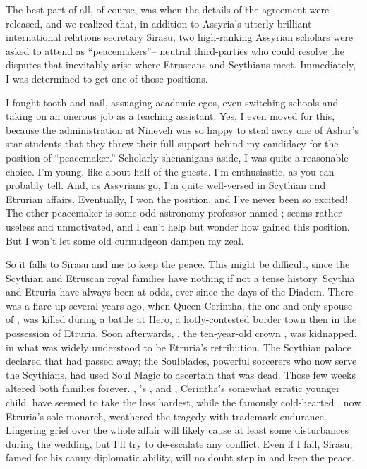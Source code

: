 \documentclass[char]{Kos}
\begin{document}
The best part of all, of course, was when the details of the agreement were released, and we realized that, in addition to Assyria's utterly brilliant international relations secretary Sirasu, two high-ranking Assyrian scholars were asked to attend as ``peacemakers''-- neutral third-parties who could resolve the disputes that inevitably arise where Etruscans and Scythians meet. Immediately, I was determined to get one of those positions.

I fought tooth and nail, assuaging academic egos, even switching schools and taking on an onerous job as a teaching assistant. Yes, I even moved for this, because the administration at Nineveh was so happy to steal away one of Ashur's star students that they threw their full support behind my candidacy for the position of ``peacemaker.'' Scholarly shenanigans aside, I was quite a reasonable choice. I'm young, like about half of the guests. I'm enthusiastic, as you can probably tell. And, as Assyrians go, I'm quite well-versed in Scythian and Etrurian affairs. Eventually, I won the position, and I've never been so excited! The other peacemaker is some odd astronomy professor named \cAnarchist{}; \cAnarchist{\they} seems rather useless and unmotivated, and I can't help but wonder how \cAnarchist{\they} gained this position. But I won't let some old curmudgeon dampen my zeal.

So it falls to Sirasu and me to keep the peace. This might be difficult, since the Scythian and Etruscan royal families have nothing if not a tense history. Scythia and Etruria have always been at odds, ever since the days of the Diadem. There was a flare-up several years ago, when Queen Cerintha, the one and only spouse of \cEtruriaKing{}, was killed during a battle at Hero, a hotly-contested border town then in the possession of Etruria. Soon afterwards, \cFugitive{}, the ten-year-old crown \cFugitive{\prince}, was kidnapped, in what was widely understood to be Etruria's retribution. The Scythian palace declared that \cFugitive{\nickname} had passed away; the Soulblades, powerful sorcerers who now serve the Scythians, had used Soul Magic to ascertain that \cFugitive{\they} was dead. Those few weeks altered both families forever. \cScythiaQueen{\nickname}, \cFugitive{}'s \cScythiaQueen{\parent}, and \cPoet{\nickname}, Cerintha's somewhat erratic younger child, have seemed to take the loss hardest, while the famously cold-hearted \cEtruriaKing{}, now Etruria's sole monarch, weathered the tragedy with \cEtruriaKing{\their} trademark endurance. Lingering grief over the whole affair will likely cause at least some disturbances during the wedding, but I'll try to de-escalate any conflict. Even if I fail, Sirasu, famed for his canny diplomatic ability, will no doubt step in and keep the peace.
\end{document}
